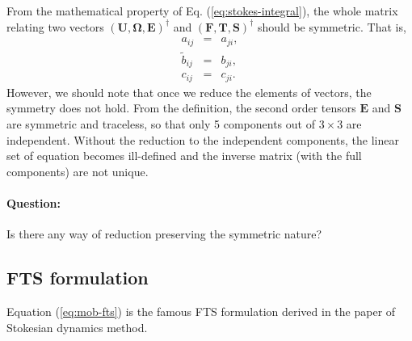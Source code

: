 \documentclass{book}
\begin{document}
From the mathematical property of Eq. (\ref{eq:stokes-integral}),
the whole matrix relating two vectors
$(\bm{U}, \bm{\Omega}, \bm{E})^\dagger$ and
$(\bm{F}, \bm{T}, \bm{S})^\dagger$
should be symmetric.
That is,
\begin{eqnarray}
  a_{ij} &=& a_{ji},\\
  \tilde{b}_{ij} &=& b_{ji},\\
  c_{ij} &=& c_{ji}.
\end{eqnarray}
However, we should note that
once we reduce the elements of vectors,
the symmetry does not hold.
From the definition, the second order tensors $\bm{E}$ and $\bm{S}$
are symmetric and traceless, so that only 5 components
out of $3\times 3$ are independent.
Without the reduction to the independent components,
the linear set of equation becomes ill-defined
and the inverse matrix (with the full components) are not unique.

\paragraph{Question:}
Is there any way of reduction
preserving the symmetric nature?


\subsection{FTS formulation}
Equation (\ref{eq:mob-fts}) is the famous FTS formulation
derived in the paper of Stokesian dynamics method\cite{DurlofskyEtal1987}.
\end{document}
